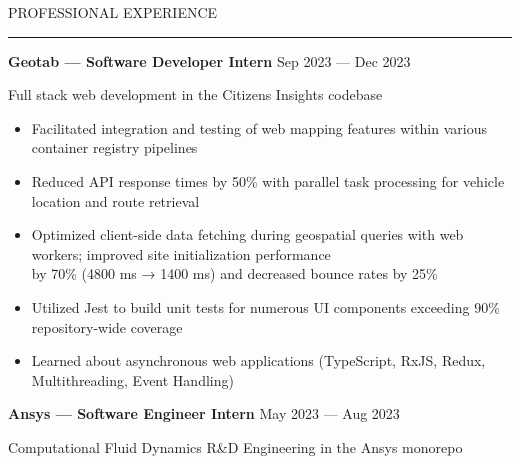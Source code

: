 \documentclass[9pt]{extarticle}
\begin{document}
\vspace{5pt}

\begin{adjustwidth}{4pt}{4pt} \large PROFESSIONAL EXPERIENCE \end{adjustwidth}
\rule[8pt]{\linewidth}{0.4pt}

\begin{adjustwidth}{10pt}{10pt}
	\vspace{-10pt}

	\textcolor{imptextblack}{\textbf{\large Geotab — Software Developer Intern}} \hfill Sep 2023 — Dec 2023
	
	Full stack web development in the Citizens Insights codebase
	
	\begin{itemize}[topsep=0pt]
	  	\item Facilitated integration and testing of web mapping features within various container registry pipelines
		\item Reduced API response times by \textcolor{imptextblack}{50\%} with parallel task processing for vehicle location and route retrieval
		\item Optimized client-side data fetching during geospatial queries with web workers; improved site initialization performance \\
			by \textcolor{imptextblack}{70\% (4800 ms → 1400 ms)} and decreased bounce rates by \textcolor{imptextblack}{25\%} 
		\item Utilized Jest to build unit tests for numerous UI components exceeding \textcolor{imptextblack}{90\%} repository-wide coverage
		\item Learned about \textcolor{imptextblack}{asynchronous} web applications (TypeScript, RxJS, Redux, Multithreading, Event Handling)
	\end{itemize}
	
	\vspace{5pt}
	\textcolor{imptextblack}{\textbf{\large Ansys — Software Engineer Intern}} \hfill May 2023 — Aug 2023
	
	Computational Fluid Dynamics R\&D Engineering in the Ansys monorepo
	

\end{adjustwidth}
\end{document}
